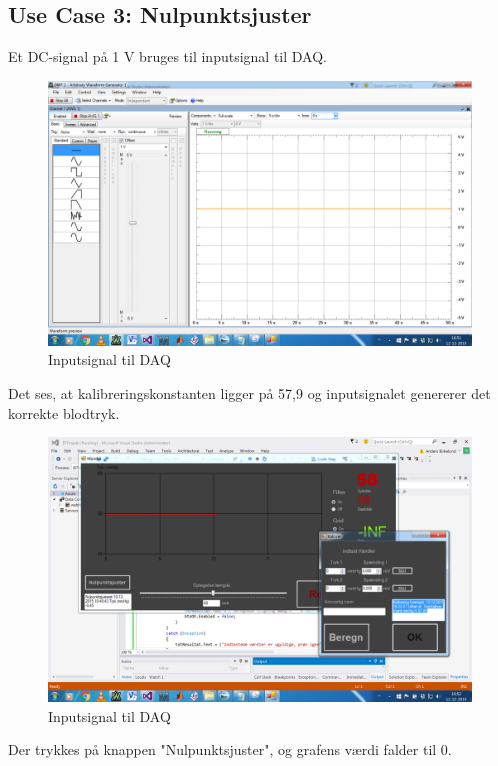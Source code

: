 \subsection{Use Case 3: Nulpunktsjuster}

Et DC-signal på 1 V bruges til inputsignal til DAQ.
\begin{figure}[H]
	\centering
	\includegraphics[width=1\textwidth]{Figurer/Test_Nul_1}
	\caption{Inputsignal til DAQ}
\end{figure}

Det ses, at kalibreringskonstanten ligger på 57,9 og inputsignalet genererer det korrekte blodtryk.
\begin{figure}[H]
	\centering
	\includegraphics[width=1\textwidth]{Figurer/Test_Nul_2}
	\caption{Inputsignal til DAQ}
\end{figure}

Der trykkes på knappen "Nulpunktsjuster", og grafens værdi falder til 0. 

